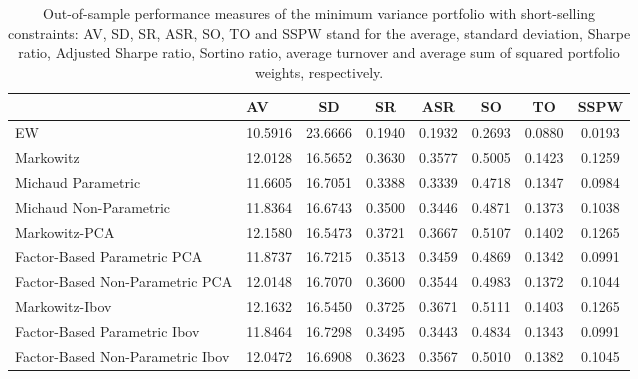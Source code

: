 \begin{table}

\caption{\label{tab:empirical_mvp}Out-of-sample performance measures of the minimum variance portfolio with short-selling constraints: AV, SD, SR, ASR, SO, TO and SSPW stand for the average, standard deviation, Sharpe ratio, Adjusted Sharpe ratio, Sortino ratio, average turnover and average sum of squared portfolio weights, respectively.}
\centering
\begin{tabular}[t]{l|l|c|c|c|c|c|c}
\hline
  & AV & SD & SR & ASR & SO & TO & SSPW\\
\hline
EW & 10.5916 & 23.6666 & 0.1940 & 0.1932 & 0.2693 & 0.0880 & 0.0193\\
\hline
Markowitz & 12.0128 & 16.5652 & 0.3630 & 0.3577 & 0.5005 & 0.1423 & 0.1259\\
\hline
Michaud Parametric & 11.6605 & 16.7051 & 0.3388 & 0.3339 & 0.4718 & 0.1347 & 0.0984\\
\hline
Michaud Non-Parametric & 11.8364 & 16.6743 & 0.3500 & 0.3446 & 0.4871 & 0.1373 & 0.1038\\
\hline
Markowitz-PCA & 12.1580 & 16.5473 & 0.3721 & 0.3667 & 0.5107 & 0.1402 & 0.1265\\
\hline
Factor-Based Parametric PCA & 11.8737 & 16.7215 & 0.3513 & 0.3459 & 0.4869 & 0.1342 & 0.0991\\
\hline
Factor-Based Non-Parametric PCA & 12.0148 & 16.7070 & 0.3600 & 0.3544 & 0.4983 & 0.1372 & 0.1044\\
\hline
Markowitz-Ibov & 12.1632 & 16.5450 & 0.3725 & 0.3671 & 0.5111 & 0.1403 & 0.1265\\
\hline
Factor-Based Parametric Ibov & 11.8464 & 16.7298 & 0.3495 & 0.3443 & 0.4834 & 0.1343 & 0.0991\\
\hline
Factor-Based Non-Parametric Ibov & 12.0472 & 16.6908 & 0.3623 & 0.3567 & 0.5010 & 0.1382 & 0.1045\\
\hline
\end{tabular}
\end{table}
